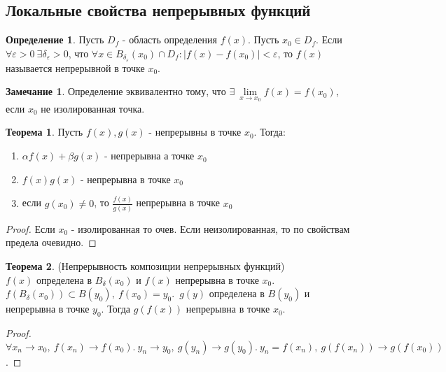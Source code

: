 \documentclass[a4paper, 12pt]{article}
\renewcommand{\epsilon}{\varepsilon}
\theoremstyle{definition}
\newtheorem*{definition}{Определение}
\newtheorem*{theorem}{Теорема}
\newtheorem*{comm}{Замечание}
\begin{document}
    \subsection{Локальные свойства непрерывных функций}
        \begin{definition}
            Пусть $D_f$ - область определения $f(x)$. Пусть $x_0\in D_f$. Если $\forall \epsilon>0\ \exists \delta_{\epsilon}>0$, что $\forall x\in B_{\delta_{\epsilon}}(x_0)\cap D_f: |f(x)-f(x_0)|<\epsilon$, то $f(x)$ называется непрерывной в точке $x_0$.
        \end{definition}  
        \begin{comm}
            Определение эквивалентно тому, что $\exists\ \lim\limits_{x\to x_0}f(x)=f(x_0)$, если $x_0$ не изолированная точка.
        \end{comm} 
        \begin{theorem}
            Пусть $f(x),g(x)$ - непрерывны в точке $x_0$. Тогда:
            \begin{enumerate}
                \item $\alpha f(x)+\beta g(x)$ - непрерывна а точке $x_0$
                \item $f(x)g(x)$ - непрерывна в точке $x_0$
                \item если $g(x_0)\ne 0$, то $\frac{f(x)}{g(x)}$ непрерывна в точке $x_0$
            \end{enumerate}
        \end{theorem} 
        \begin{proof}
            Если $x_0$ - изолированная то очев. Если неизолированная, то по свойствам предела очевидно.
        \end{proof} 
        \begin{theorem} (Непрерывность композиции непрерывных функций) \\
            $f(x)$ определена в $B_{\delta}(x_0)$ и $f(x)$ непрерывна в точке $x_0$.\ $f(B_{\delta}(x_0))\subset B(y_0),\ f(x_0)=y_0$.\ $g(y)$ определена в $B(y_0)$ и непрерывна в точке $y_0$. Тогда $g(f(x))$ непрерывна в точке $x_0$.
        \end{theorem} 
        \begin{proof}
            $\forall x_n\to x_0,\ f(x_n)\to f(x_0).\ y_n\to y_0,\ g(y_n)\to g(y_0).\ y_n=f(x_n),\ g(f(x_n))\to g(f(x_0))$.
        \end{proof} 
\end{document}
